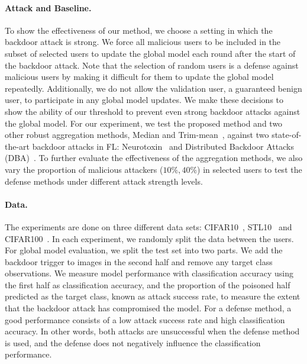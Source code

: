 \documentclass{article} %
\begin{document}
\paragraph{Attack and Baseline.} To show the effectiveness of our method, we choose a setting in which the backdoor attack is strong. We force all malicious users to be included in the subset of selected users to update the global model each round after the start of the backdoor attack. Note that the selection of random users is a defense against malicious users by making it difficult for them to update the global model repeatedly. Additionally, we do not allow the validation user, a guaranteed benign user, to participate in any global model updates. We make these decisions to show the ability of our threshold to prevent even strong backdoor attacks against the global model. 
For our experiment, we test the proposed method and two other robust aggregation methods, Median and Trim-mean~\citep{trim-mean}, against two state-of-the-art backdoor attacks in FL: Neurotoxin~\citep{neurotoxin} and Distributed Backdoor Attacks (DBA)~\citep{dba}. To further evaluate the effectiveness of the aggregation methods, we also vary the proportion of malicious attackers ($10\%, 40\%$) in selected users to test the defense methods under different attack strength levels.

\paragraph{Data.} The experiments are done on three different data sets: CIFAR10~\citep{krizhevsky2009learning}, STL10~\citep{coates2011analysis} and CIFAR100~\citep{krizhevsky2009learning}. In each experiment, we randomly split the data between the users. For global model evaluation, we split the test set into two parts. We add the backdoor trigger to images in the second half and remove any target class observations. We measure model performance with classification accuracy using the first half as {\color{blue}classification accuracy}, and the proportion of the poisoned half predicted as the target class, known as {\color{red}attack success rate}, to measure the extent that the backdoor attack has compromised the model. 
For a defense method, a good performance consists of a low attack success rate and high classification accuracy. In other words, both attacks are unsuccessful when the defense method is used, and the defense does not negatively influence the classification performance. 
\end{document}
